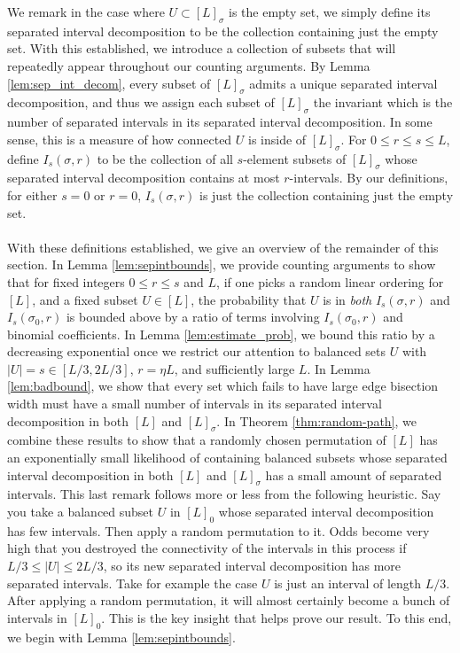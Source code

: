 \documentclass[11pt,a4paper]{amsart}
\theoremstyle{definition}
\theoremstyle{remark}
\begin{document}
We remark in the case where $U \subset [L]_{\sigma}$ is the empty set, we simply define its separated interval decomposition to be the collection containing just the empty set.  With this established, we introduce a collection of subsets that will repeatedly appear throughout our counting arguments.  By Lemma \ref{lem:sep_int_decom}, every subset of $[L]_{\sigma}$ admits a unique separated interval decomposition, and thus we assign each subset of $[L]_{\sigma}$ the invariant which is the number of separated intervals in its separated interval decomposition.  In some sense, this is a measure of how connected $U$ is inside of $[L]_{\sigma}$.  For $0 \leq r \leq s \leq L$, define $I_{s}(\sigma,r)$ to be the collection of all $s$-element subsets of $[L]_{\sigma}$ whose separated interval decomposition contains at most $r$-intervals.  By our definitions, for either $s = 0$ or $r = 0$, $I_{s}(\sigma,r)$ is just the collection containing just the empty set.  
\\
\\
With these definitions established, we give an overview of the remainder of this section.  In Lemma \ref{lem:sepintbounds}, we provide counting arguments to show that for fixed integers $0 \leq r \leq s$ and $L$, if one picks a random linear ordering for $[L]$, and a fixed subset $U \in [L]$, the probability that $U$ is in \emph{both} $I_{s}(\sigma,r)$ and $I_{s}(\sigma_{0},r)$ is bounded above by a ratio of terms involving $I_{s}(\sigma_{0},r)$ and binomial coefficients.  In Lemma \ref{lem:estimate_prob}, we bound this ratio by a decreasing exponential once we restrict our attention to balanced sets $U$ with $|U| = s \in [L/3,2L/3]$, $r = \eta L$, and sufficiently large $L$.  In Lemma \ref{lem:badbound}, we show that every set which fails to have large edge bisection width must have a small number of intervals in its separated interval decomposition in both $[L]$ and $[L]_{\sigma}$.  In Theorem \ref{thm:random-path}, we combine these results to show that a randomly chosen permutation of $[L]$ has an exponentially small likelihood of containing balanced subsets whose separated interval decomposition in both $[L]$ and $[L]_{\sigma}$ has a small amount of separated intervals.  This last remark follows more or less from the following heuristic.  Say you take a balanced subset $U$ in $[L]_{0}$ whose separated interval decomposition has few intervals.  Then apply a random permutation to it.  Odds become very high that you destroyed the connectivity of the intervals in this process if $L/3 \leq |U| \leq 2L/3$, so its new separated interval decomposition has more separated intervals.  Take for example the case $U$ is just an interval of length $L/3$.  After applying a random permutation, it will almost certainly become a bunch of intervals in $[L]_{0}$.  This is the key insight that helps prove our result.  To this end, we begin with Lemma \ref{lem:sepintbounds}.  
\end{document}
